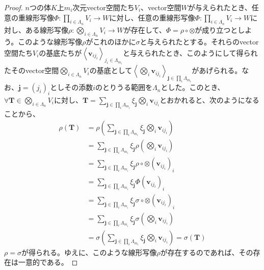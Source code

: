 \documentclass[dvipdfmx]{jsarticle}
\begin{document}
\begin{proof}
$n$つの体$K$上$m_{i}$次元vector空間たち$V_{i}$、vector空間$W$が与えられたとき、任意の重線形写像$\varPhi:\prod_{i \in \varLambda_{n}} V_{i} \rightarrow W$に対し、任意の重線形写像$\varPhi:\prod_{i \in \varLambda_{n}} V_{i} \rightarrow W$に対し、ある線形写像$\rho:\bigotimes_{i \in \varLambda_{n}} V_{i} \rightarrow W$が存在して、$\varPhi = \rho \circ \otimes$が成り立つとしよう。このような線形写像$\rho$がこれのほかに$\sigma$と与えられたとする。それらのvector空間たち$V_{i}$の基底たちが$\left\langle \mathbf{v}_{ij_{i}} \right\rangle_{j_{i} \in \varLambda_{m_{i}}}$と与えられたとき、このようにして得られたそのvector空間$\bigotimes_{i \in \varLambda_{n}} V_{i}$の基底として$\left\langle \bigotimes_{i} \mathbf{v}_{ij_{i}} \right\rangle_{\mathbf{j}\in \prod_{i} \varLambda_{m_{i}}}$があげられる。なお、$\mathbf{j}=\left( j_{i} \right)_{i} $としその添数$i$のとりうる範囲を$\varLambda_{n}$とした。このとき、$\forall\mathbf{T} \in \bigotimes_{i \in \varLambda_{n}} V_{i}$に対し、$\mathbf{T} = \sum_{\mathbf{j}\in \prod_{i} \varLambda_{m_{i}}} {\xi_{\mathbf{j}}\bigotimes_{i} \mathbf{v}_{ij_{i}}}$とおかれると、次のようになることから、
\begin{align*}
\rho\left( \mathbf{T} \right) &= \rho\left( \sum_{\mathbf{j}\in \prod_{i} \varLambda_{m_{i}}} {\xi_{\mathbf{j}}\bigotimes_{i} \mathbf{v}_{ij_{i}}} \right)\\
&= \sum_{\mathbf{j}\in \prod_{i} \varLambda_{m_{i}}} {\xi_{\mathbf{j}}\rho\left( \bigotimes_{i} \mathbf{v}_{ij_{i}} \right)}\\
&= \sum_{\mathbf{j}\in \prod_{i} \varLambda_{m_{i}}} {\xi_{\mathbf{j}}\rho \circ \otimes \left( \mathbf{v}_{ij_{i}} \right)_{i}}\\
&= \sum_{\mathbf{j}\in \prod_{i} \varLambda_{m_{i}}} {\xi_{\mathbf{j}}\varPhi\left( \mathbf{v}_{ij_{i}} \right)_{i}}\\
&= \sum_{\mathbf{j}\in \prod_{i} \varLambda_{m_{i}}} {\xi_{\mathbf{j}}\sigma \circ \otimes \left( \mathbf{v}_{ij_{i}} \right)_{i}}\\
&= \sum_{\mathbf{j}\in \prod_{i} \varLambda_{m_{i}}} {\xi_{\mathbf{j}}\sigma\left( \bigotimes_{i} \mathbf{v}_{ij_{i}} \right)}\\
&= \sigma\left( \sum_{\mathbf{j}\in \prod_{i} \varLambda_{m_{i}}} {\xi_{\mathbf{j}}\bigotimes_{i} \mathbf{v}_{ij_{i}}} \right) = \sigma\left( \mathbf{T} \right)
\end{align*}
$\rho = \sigma$が得られる。ゆえに、このような線形写像$\rho$が存在するのであれば、その存在は一意的である。\par

\end{proof}
\end{document}
